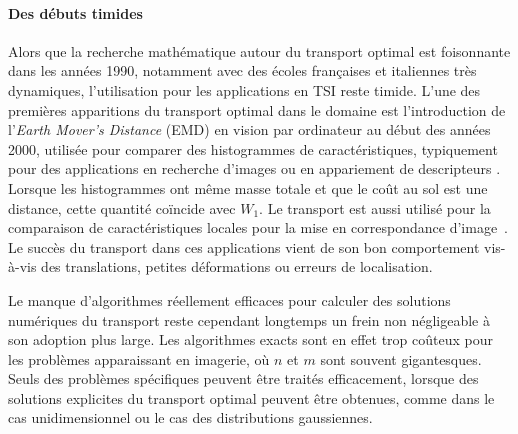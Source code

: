 \documentclass[11pt,a4paper]{article}
\begin{document}
\paragraph{Des débuts timides}
Alors que la recherche mathématique autour du transport optimal est foisonnante dans les années 1990, notamment avec des écoles françaises et italiennes très dynamiques, l'utilisation pour les applications en TSI reste timide. 
L'une des premières apparitions du transport optimal dans le domaine est l'introduction de l'\emph{Earth Mover's Distance} (EMD) en vision par ordinateur au début des années 2000, utilisée pour comparer des histogrammes de caractéristiques, typiquement pour des applications en recherche d'images ou en appariement de descripteurs \cite{Rubner2000}. Lorsque les histogrammes ont même masse totale et que le coût au sol est une distance, cette quantité coïncide avec $W_1$. Le transport est aussi utilisé pour la comparaison de caractéristiques locales pour la mise en correspondance d'image~\cite{rabin2009statistical}. Le succès du transport dans ces applications vient de son bon comportement vis-à-vis des translations, petites déformations ou erreurs de localisation. 

Le manque d'algorithmes réellement efficaces pour calculer des solutions numériques du transport reste cependant longtemps un frein non négligeable à son adoption plus large. Les algorithmes exacts sont en effet trop coûteux pour les problèmes apparaissant en imagerie, où $n$ et $m$ sont souvent gigantesques. Seuls des problèmes spécifiques peuvent être traités efficacement, lorsque des solutions explicites du transport optimal peuvent être obtenues, comme dans le cas unidimensionnel ou le cas des distributions gaussiennes. %
\end{document}
